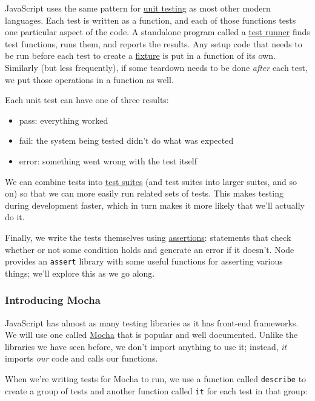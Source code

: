 JavaScript uses the same pattern for
\protect\hyperlink{g:unit-test}{unit testing} as most other modern
languages. Each test is written as a function, and each of those
functions tests one particular aspect of the code. A standalone program
called a \protect\hyperlink{g:test-runner}{test runner} finds test
functions, runs them, and reports the results. Any setup code that needs
to be run before each test to create a
\protect\hyperlink{g:fixture}{fixture} is put in a function of its own.
Similarly (but less frequently), if some teardown needs to be done
\emph{after} each test, we put those operations in a function as well.

Each unit test can have one of three results:

\begin{itemize}
\tightlist
\item
  pass: everything worked
\item
  fail: the system being tested didn't do what was expected
\item
  error: something went wrong with the test itself
\end{itemize}

We can combine tests into \protect\hyperlink{g:test-suite}{test suites}
(and test suites into larger suites, and so on) so that we can more
easily run related sets of tests. This makes testing during development
faster, which in turn makes it more likely that we'll actually do it.

Finally, we write the tests themselves using
\protect\hyperlink{g:assertion}{assertions}: statements that check
whether or not some condition holds and generate an error if it doesn't.
Node provides an \texttt{assert} library with some useful functions for
asserting various things; we'll explore this as we go along.

\subsubsection{Introducing Mocha}\label{s:testing-mocha}

JavaScript has almost as many testing libraries as it has front-end
frameworks. We will use one called \href{https://mochajs.org/}{Mocha}
that is popular and well documented. Unlike the libraries we have seen
before, we don't import anything to use it; instead, \emph{it} imports
\emph{our} code and calls our functions.

When we're writing tests for Mocha to run, we use a function called
\texttt{describe} to create a group of tests and another function called
\texttt{it} for each test in that group:

